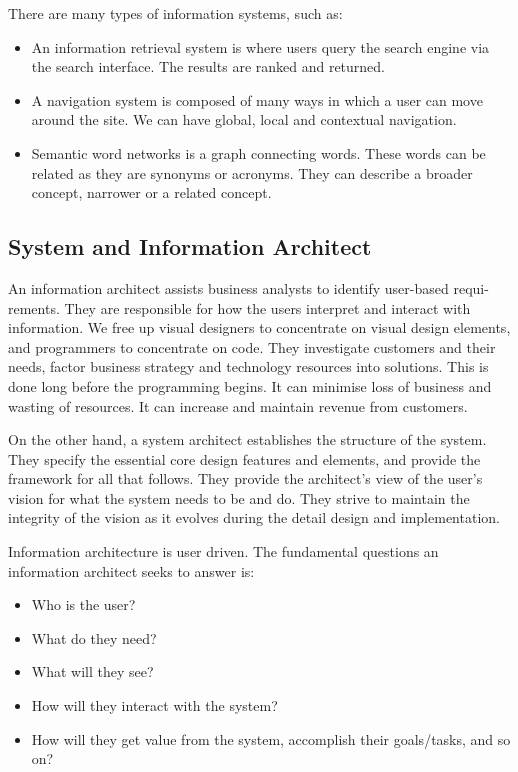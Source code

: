 \documentclass[a4paper, openany]{memoir}
\begin{document}
There are many types of information systems, such as:
\begin{itemize}
    \item An information retrieval system is where users query the search engine via the search interface. The results are ranked and returned. 
    \item A navigation system is composed of many ways in which a user can move around the site. We can have global, local and contextual navigation.
    \item Semantic word networks is a graph connecting words. These words can be related as they are synonyms or acronyms. They can describe a broader concept, narrower or a related concept.
\end{itemize}

\subsection{System and Information Architect}
An information architect assists business analysts to identify user-based requi-rements. They are responsible for how the users interpret and interact with information. We free up visual designers to concentrate on visual design elements, and programmers to concentrate on code. They investigate customers and their needs, factor business strategy and technology resources into solutions. This is done long before the programming begins. It can minimise loss of business and wasting of resources. It can increase and maintain revenue from customers.

On the other hand, a system architect establishes the structure of the system. They specify the essential core design features and elements, and provide the framework for all that follows. They provide the architect's view of the user's vision for what the system needs to be and do. They strive to maintain the integrity of the vision as it evolves during the detail design and implementation.

Information architecture is user driven. The fundamental questions an information architect seeks to answer is:
\begin{itemize}
    \item Who is the user?
    \item What do they need?
    \item What will they see?
    \item How will they interact with the system?
    \item How will they get value from the system, accomplish their goals/tasks, and so on?
\end{itemize}
\end{document}
